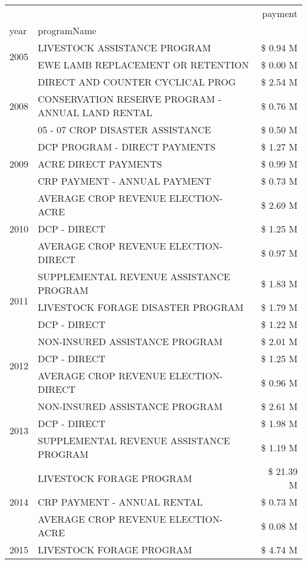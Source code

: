 \begin{tabular}{llr}
\toprule
 &  & payment \\
year & programName &  \\
\midrule
\multirow[t]{2}{*}{2005} & LIVESTOCK ASSISTANCE PROGRAM & \$ 0.94 M \\
 & EWE LAMB REPLACEMENT OR RETENTION & \$ 0.00 M \\
\cline{1-3}
\multirow[t]{3}{*}{2008} & DIRECT AND COUNTER CYCLICAL PROG & \$ 2.54 M \\
 & CONSERVATION RESERVE PROGRAM - ANNUAL LAND RENTAL & \$ 0.76 M \\
 & 05 - 07 CROP DISASTER ASSISTANCE & \$ 0.50 M \\
\cline{1-3}
\multirow[t]{3}{*}{2009} & DCP PROGRAM - DIRECT PAYMENTS & \$ 1.27 M \\
 & ACRE DIRECT PAYMENTS & \$ 0.99 M \\
 & CRP PAYMENT - ANNUAL PAYMENT & \$ 0.73 M \\
\cline{1-3}
\multirow[t]{3}{*}{2010} & AVERAGE CROP REVENUE ELECTION-ACRE & \$ 2.69 M \\
 & DCP - DIRECT & \$ 1.25 M \\
 & AVERAGE CROP REVENUE ELECTION-DIRECT & \$ 0.97 M \\
\cline{1-3}
\multirow[t]{3}{*}{2011} & SUPPLEMENTAL REVENUE ASSISTANCE PROGRAM & \$ 1.83 M \\
 & LIVESTOCK FORAGE DISASTER PROGRAM & \$ 1.79 M \\
 & DCP - DIRECT & \$ 1.22 M \\
\cline{1-3}
\multirow[t]{3}{*}{2012} & NON-INSURED ASSISTANCE PROGRAM & \$ 2.01 M \\
 & DCP - DIRECT & \$ 1.25 M \\
 & AVERAGE CROP REVENUE ELECTION-DIRECT & \$ 0.96 M \\
\cline{1-3}
\multirow[t]{3}{*}{2013} & NON-INSURED ASSISTANCE PROGRAM & \$ 2.61 M \\
 & DCP - DIRECT & \$ 1.98 M \\
 & SUPPLEMENTAL REVENUE ASSISTANCE PROGRAM & \$ 1.19 M \\
\cline{1-3}
\multirow[t]{3}{*}{2014} & LIVESTOCK FORAGE PROGRAM & \$ 21.39 M \\
 & CRP PAYMENT - ANNUAL RENTAL & \$ 0.73 M \\
 & AVERAGE CROP REVENUE ELECTION-ACRE & \$ 0.08 M \\
\cline{1-3}
\multirow[t]{3}{*}{2015} & LIVESTOCK FORAGE PROGRAM & \$ 4.74 M \\

\end{tabular}

